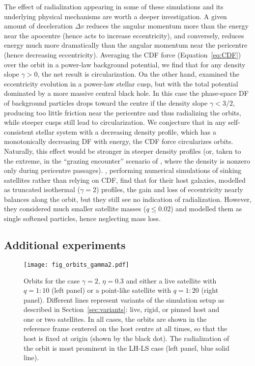 \documentclass[twocolumn]{aastex63}
\newcommand{\LH}{\textsf{L\!H}\xspace}
\newcommand{\LS}{\textsf{L\!S}\xspace}
\begin{document}
The effect of radialization appearing in some of these simulations and its underlying physical mechanisms are worth a deeper investigation. A given amount of deceleration $\Delta v$ reduces the angular momentum more than the energy near the apocentre (hence acts to increase eccentricity), and conversely, reduces energy much more dramatically than the angular momentum near the pericentre (hence decreasing eccentricity). Averaging the CDF force (Equation~\ref{eq:CDF}) over the orbit in a power-law background potential, we find that for any density slope $\gamma>0$, the net result is circularization. On the other hand, \citet{Gould2003} examined the eccentricity evolution in a power-law stellar cusp, but with the total potential dominated by a more massive central black hole. In this case the phase-space DF of background particles drops toward the centre if the density slope $\gamma<3/2$, producing too little friction near the pericentre and thus radializing the orbits, while steeper cusps still lead to circularization. We conjecture that in any self-consistent stellar system with a decreasing density profile, which has a monotonically decreasing DF with energy, the CDF force circularizes orbits. Naturally, this effect would be stronger in steeper density profiles (or, taken to the extreme, in the ``grazing encounter'' scenario of \citealt{Bontekoe1987}, where the density is nonzero only during pericentre passages). \citet{vdBosch1999}, performing numerical simulations of sinking satellites rather than relying on CDF, find that for their host galaxies, modelled as truncated isothermal ($\gamma=2$) profiles, the gain and loss of eccentricity nearly balances along the orbit, but they still see no indication of radialization. However, they considered much smaller satellite masses ($q \le 0.02$) and modelled them as single softened particles, hence neglecting mass loss.

\subsection{Additional experiments}  \label{sec:tweaks}

\begin{figure}
\texttt{[image: fig\_orbits\_gamma2.pdf]}
\caption{Orbits for the case $\gamma=2$, $\eta=0.3$ and either a live satellite with $q=1:10$ (left panel) or a point-like satellite with $q=1:20$ (right panel). Different lines represent variants of the simulation setup as described in Section~\ref{sec:variants}: live, rigid, or pinned host and one or two satellites. In all cases, the orbits are shown in the reference frame centered on the host centre at all times, so that the host is fixed at origin (shown by the black dot). The radialization of the orbit is most prominent in the \LH-\LS case (left panel, blue solid line).
}  \label{fig:orbits_gamma2}
\end{figure}
\end{document}
